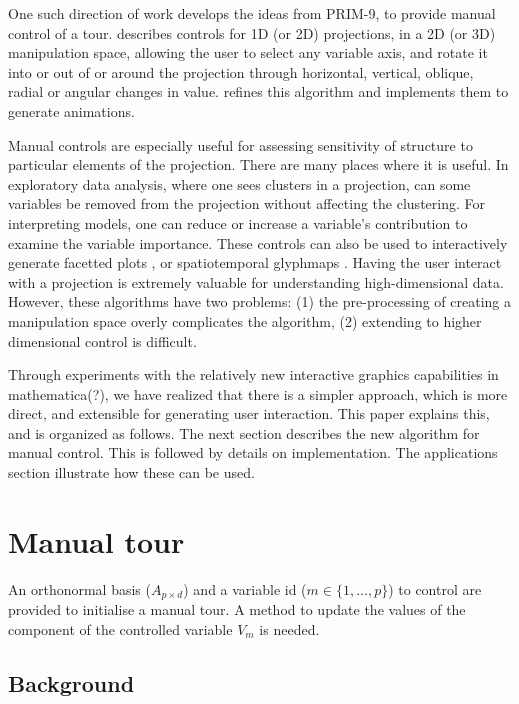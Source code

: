 \documentclass[]{interact}
\theoremstyle{plain}%
\theoremstyle{definition}
\theoremstyle{remark}
\begin{document}
One such direction of work develops the ideas from PRIM-9, to provide
manual control of a tour. \citet{cook_manual_1997} describes controls
for 1D (or 2D) projections, in a 2D (or 3D) manipulation space, allowing
the user to select any variable axis, and rotate it into or out of or
around the projection through horizontal, vertical, oblique, radial or
angular changes in value. \citet{spyrison_spinifex_2020} refines this
algorithm and implements them to generate animations.

Manual controls are especially useful for assessing sensitivity of
structure to particular elements of the projection. There are many
places where it is useful. In exploratory data analysis, where one sees
clusters in a projection, can some variables be removed from the
projection without affecting the clustering. For interpreting models,
one can reduce or increase a variable's contribution to examine the
variable importance. These controls can also be used to interactively
generate facetted plots \citep{XXX}, or spatiotemporal glyphmaps
\citep{XXX}. Having the user interact with a projection is extremely
valuable for understanding high-dimensional data. However, these
algorithms have two problems: (1) the pre-processing of creating a
manipulation space overly complicates the algorithm, (2) extending to
higher dimensional control is difficult.

Through experiments with the relatively new interactive graphics
capabilities in mathematica(?), we have realized that there is a simpler
approach, which is more direct, and extensible for generating user
interaction. This paper explains this, and is organized as follows. The
next section describes the new algorithm for manual control. This is
followed by details on implementation. The applications section
illustrate how these can be used.

\hypertarget{sec:method}{%
\section{Manual tour}\label{sec:method}}

An orthonormal basis (\(A_{p\times d}\)) and a variable id
(\(m \in \{1, ..., p\}\)) to control are provided to initialise a manual
tour. A method to update the values of the component of the controlled
variable \(V_m\) is needed.

\hypertarget{background}{%
\subsection{Background}\label{background}}
\end{document}
